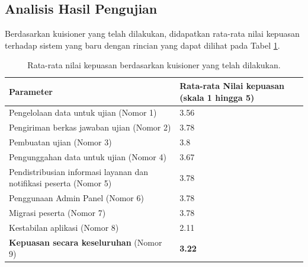 \subsection{Analisis Hasil Pengujian}
    Berdasarkan
    kuisioner yang telah dilakukan, didapatkan rata-rata nilai kepuasan terhadap sistem yang baru dengan
    rincian yang dapat dilihat pada Tabel \ref{tab:survey-avg}.
    \begin{table}[h]
        \centering
        \caption{Rata-rata nilai kepuasan berdasarkan kuisioner yang telah dilakukan.}
        \label{tab:survey-avg}
        \begin{tabularx}{\textwidth}{|X|X|}
            \hline
             Parameter & Rata-rata Nilai kepuasan (skala 1 hingga 5)  \\
            \hline
             Pengelolaan data untuk ujian (Nomor 1) &  3.56 \\
            \hline
             Pengiriman berkas jawaban ujian (Nomor 2) &  3.78\\
            \hline
             Pembuatan ujian (Nomor 3) &  3.8 \\
            \hline
             Pengunggahan data untuk ujian (Nomor 4) &  3.67 \\
            \hline
             Pendistribusian informasi layanan dan notifikasi peserta (Nomor 5) &  3.78 \\
            \hline
             Penggunaan Admin Panel (Nomor 6) &  3.78 \\
            \hline
             Migrasi peserta (Nomor 7) &  3.78 \\
            \hline
             Kestabilan aplikasi (Nomor 8) &  2.11 \\
            \hline
             \textbf{Kepuasan secara keseluruhan} (Nomor 9) &  \textbf{3.22} \\
            \hline
        \end{tabularx}
    \end{table}
    
